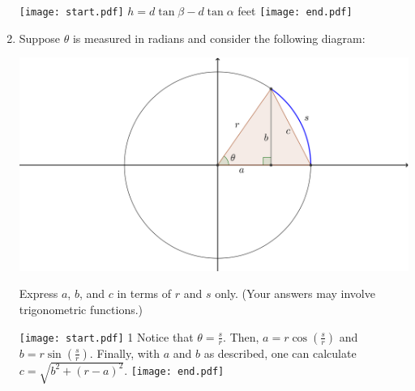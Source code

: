 \documentclass[12pt]{article}
\begin{document}
\begin{enumerate}
\texttt{[image: start.pdf]}
{$h=d\tan\beta-d\tan\alpha$ feet}
\texttt{[image: end.pdf]}


\item Suppose $\theta$ is measured in radians and consider the following diagram:
\begin{center}
\includegraphics[scale=0.3]{circle.png}
\end{center}
Express $a$, $b$, and $c$ in terms of $r$ and $s$ only. (Your answers may involve trigonometric functions.)

\texttt{[image: start.pdf]}
{{{1\linewidth}{
Notice that $\theta = \frac{s}{r}$.  Then, $a=r\cos\left(\frac{s}{r}\right)$ and $b=r\sin\left(\frac{s}{r}\right)$.  Finally, with $a$ and $b$ as described, one can calculate $c=\sqrt{b^2+(r-a)^2}$.
}}}
\texttt{[image: end.pdf]}


\end{enumerate}
\end{document}
